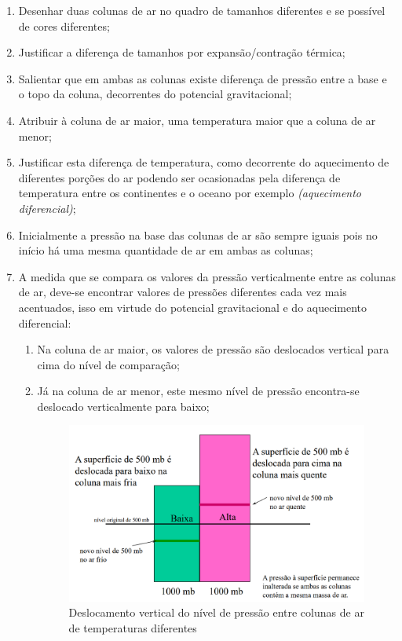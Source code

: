 \documentclass[
12pt,				%
openright,			%
oneside,			%
a4paper,			%
chapter=TITLE,		%
english,			%
brazil				%
]{abntex2}
\begin{document}
\begin{enumerate}[label=\roman *)]
		\item Desenhar duas colunas de ar no quadro de tamanhos diferentes e se possível de cores diferentes;
		\item Justificar a diferença de tamanhos por expansão/contração térmica;
		\item Salientar que em ambas as colunas existe diferença de pressão entre a base e o topo da coluna, decorrentes do potencial gravitacional;
		\item Atribuir à coluna de ar maior, uma temperatura maior que a coluna de ar menor;
		\item Justificar esta diferença de temperatura, como decorrente do aquecimento de diferentes porções do ar podendo ser ocasionadas pela diferença de temperatura entre os continentes e o oceano por exemplo \textit{(aquecimento diferencial)};
		\item Inicialmente a pressão na base das colunas de ar são sempre iguais pois no início há uma mesma quantidade de ar em ambas as colunas;
		\item A medida que se compara os valores da pressão verticalmente entre as colunas de ar, deve-se encontrar valores de pressões diferentes cada vez mais acentuados, isso em virtude do potencial gravitacional e do aquecimento diferencial:
			\begin{enumerate}[label=\alph *)]
					\item Na coluna de ar maior, os valores de pressão são deslocados vertical para cima do nível de comparação;
					\item Já na coluna de ar menor, este mesmo nível de pressão encontra-se deslocado verticalmente para baixo;
						\begin{figure}[htb!]
							\centering
							\includegraphics[width=.7\linewidth]{img/deslocamento-ar-01.png}
							\caption{Deslocamento vertical do nível de pressão entre colunas de ar de temperaturas diferentes}
							\label{fig:gradiente01}

\end{figure}
\end{enumerate}
\end{enumerate}
\end{document}
